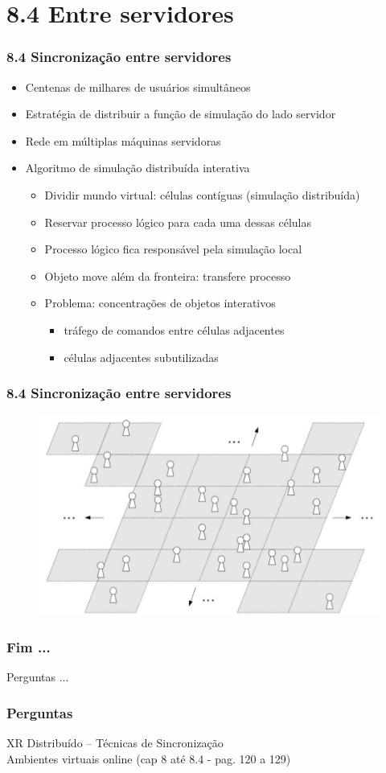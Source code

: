 \documentclass{beamer}
\begin{document}
\section{8.4 Entre servidores}

\begin{frame}
  \frametitle{8.4 Sincronização entre servidores}
  \begin{itemize}
    \item Centenas de milhares de usuários simultâneos
    \item Estratégia de distribuir a função de simulação do lado servidor
    \item Rede em múltiplas máquinas servidoras
    \item Algoritmo de simulação distribuída interativa
    \begin{itemize}
      \item Dividir mundo virtual: células contíguas (simulação distribuída)
      \item Reservar processo lógico para cada uma dessas células
      \item Processo lógico fica responsável pela simulação local
      \item Objeto move além da fronteira: transfere processo
      \item Problema: concentrações de objetos interativos
      \begin{itemize}
        \item tráfego de comandos entre células  adjacentes
        \item células adjacentes subutilizadas
      \end{itemize}
    \end{itemize}
  \end{itemize}
\end{frame}

\begin{frame}
  \frametitle{8.4 Sincronização entre servidores}
  \begin{figure}[h]
    \centering
    \vspace{-18pt}
    \includegraphics[width=1.03\textwidth]{imagem_84.png}
    \vspace{-20pt}
  \end{figure}
\end{frame}

\begin{frame}
  \frametitle{Fim ...}
  Perguntas ...
\end{frame}

\begin{frame}
  \frametitle{Perguntas}
  XR Distribuído – Técnicas de Sincronização \\
  Ambientes virtuais online (cap 8 até 8.4 - pag. 120 a 129)
\end{frame}
\end{document}
